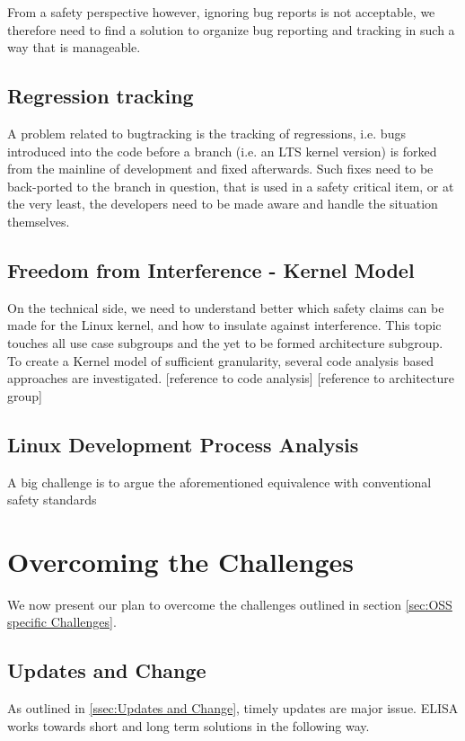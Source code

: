 \documentclass[12pt]{ElisaPaper}
\begin{document}
From a safety perspective however, ignoring bug reports is not acceptable, we therefore need to find a solution to organize bug reporting and tracking in such a way that is manageable.

\subsection{Regression tracking}
A problem related to bugtracking is the tracking of regressions, i.e. bugs introduced into the code before a branch (i.e. an LTS kernel version) is forked from the mainline of development and fixed afterwards. Such fixes need to be back-ported to the branch in question, that is used in a safety critical item, or at the very least, the developers need to be made aware and handle the situation themselves.



\subsection{Freedom from Interference - Kernel Model}
On the technical side, we need to understand better which safety claims can be made for the Linux kernel, and how to insulate against interference. 
This topic touches all use case subgroups and the yet to be formed architecture subgroup.
To create a Kernel model of sufficient granularity, several code analysis based approaches are investigated.
[reference to code analysis]
[reference to architecture group]

\subsection{Linux Development Process Analysis}
A big challenge is to argue the aforementioned equivalence with conventional safety standards 


\section{Overcoming the Challenges}
We now present our plan to overcome the challenges outlined in section \ref{sec:OSS specific Challenges}.

\subsection{Updates and Change}
As outlined in \ref{ssec:Updates and Change}, timely updates are major issue. ELISA works towards short and long term solutions in the following way.
\end{document}

